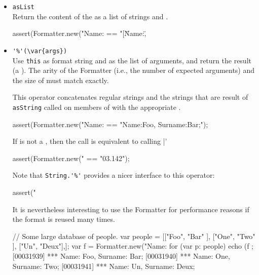 \begin{itemize}
\item \lstinline|asList|\\
  Return the content of the  as a list of strings and
  .
\begin{urbiscript}[firstnumber=last]
assert(Formatter.new("Name:%
       == "[\"Name:\", %
\end{urbiscript}

\item \lstinline|'%'(\var{args})|\\
  Use \lstinline|this| as format string and  as the list of
  arguments, and return the result (a ).  The arity
  of the Formatter (i.e., the number of expected arguments) and the
  size of  must match exactly.

  This operator concatenates regular strings and the strings that are
  result of \lstinline|asString| called on members of  with
  the appropriate .
\begin{urbiscript}[firstnumber=last]
assert(Formatter.new("Name:%
       == "Name:Foo, Surname:Bar;");
\end{urbiscript}

  If  is not a , then the call is equivalent
  to calling |'%
\begin{urbiscript}[firstnumber=last]
assert(Formatter.new("%
       == "03.142");
\end{urbiscript}

  Note that \lstinline|String.'%'| provides a nicer interface to this
  operator:
\begin{urbiscript}[firstnumber=last]
assert("%
\end{urbiscript}

  It is nevertheless interesting to use the Formatter for performance
  reasons if the format is reused many times.
\begin{urbiscript}[firstnumber=last]
{
  // Some large database of people.
  var people =
    [["Foo", "Bar" ],
     ["One", "Two" ],
     ["Un",  "Deux"],];
  var f = Formatter.new("Name:%
  for (var p: people)
    echo (f %
};
[00031939] *** Name:    Foo, Surname:    Bar;
[00031940] *** Name:    One, Surname:    Two;
[00031941] *** Name:     Un, Surname:   Deux;
\end{urbiscript}


\end{itemize}
